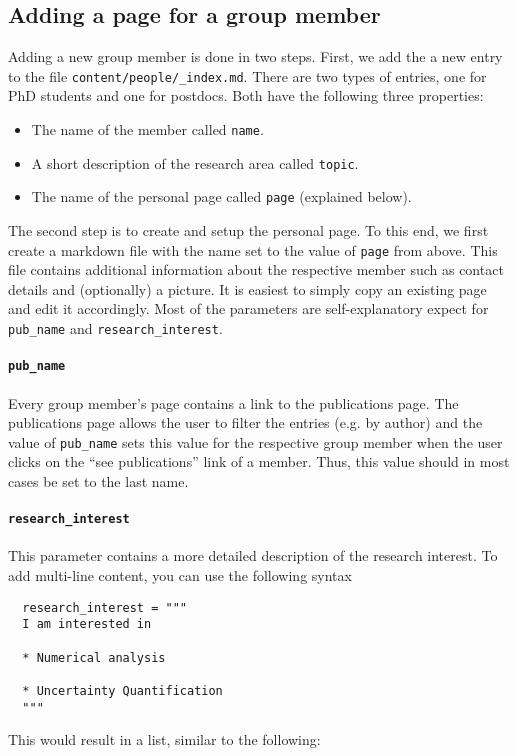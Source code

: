 \documentclass[a4paper,parskip=half]{scrartcl}
\begin{document}
\subsection{Adding a page for a group member}
Adding a new group member is done in two steps. First, we add the a new entry to
the file \texttt{content/people/\_index.md}. There are two types of entries, one
for PhD students and one for postdocs. Both have the following three properties:
\begin{itemize}
\item The name of the member called \texttt{name}.
\item A short description of the research area called \texttt{topic}.
\item The name of the personal page called \texttt{page} (explained below).
\end{itemize}
The second step is to create and setup the personal page. To this end, we first
create a markdown file with the name set to the value of \texttt{page} from
above. This file contains additional information about the respective member
such as contact details and (optionally) a picture. It is easiest to simply copy
an existing page and edit it accordingly. Most of the parameters are
self-explanatory expect for \texttt{pub\_name} and \texttt{research\_interest}.

\paragraph{\texttt{pub\_name}}
Every group member's page contains a link to the publications page. The
publications page allows the user to filter the entries (e.g. by author) and the
value of \texttt{pub\_name} sets this value for the respective group member when
the user clicks on the ``see publications'' link of a member. Thus, this value
should in most cases be set to the last name.

\paragraph{\texttt{research\_interest}}
This parameter contains a more detailed description of the research interest. To
add multi-line content, you can use the following syntax
\begin{verbatim}
  research_interest = """
  I am interested in 

  * Numerical analysis

  * Uncertainty Quantification
  """
\end{verbatim}
This would result in a list, similar to the following:
\end{document}
